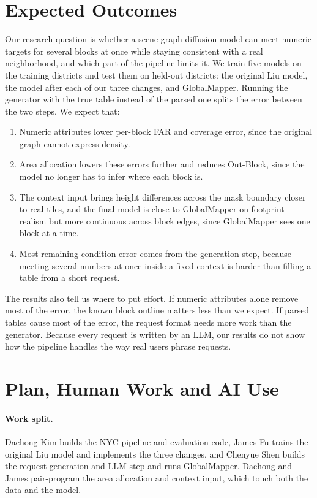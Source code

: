 \documentclass[twocolumn,11pt]{article}
\begin{document}
\section{Expected Outcomes}
Our research question is whether a scene-graph diffusion model can meet numeric targets for several blocks at once while staying consistent with a real neighborhood, and which part of the pipeline limits it. We train five models on the training districts and test them on held-out districts: the original Liu model, the model after each of our three changes, and GlobalMapper. Running the generator with the true table instead of the parsed one splits the error between the two steps. We expect that:

\begin{enumerate}
    \item Numeric attributes lower per-block FAR and coverage error, since the original graph cannot express density.
    \item Area allocation lowers these errors further and reduces Out-Block, since the model no longer has to infer where each block is.
    \item The context input brings height differences across the mask boundary closer to real tiles, and the final model is close to GlobalMapper on footprint realism but more continuous across block edges, since GlobalMapper sees one block at a time.
    \item Most remaining condition error comes from the generation step, because meeting several numbers at once inside a fixed context is harder than filling a table from a short request.
\end{enumerate}

The results also tell us where to put effort. If numeric attributes alone remove most of the error, the known block outline matters less than we expect. If parsed tables cause most of the error, the request format needs more work than the generator. Because every request is written by an LLM, our results do not show how the pipeline handles the way real users phrase requests.


\section{Plan, Human Work and AI Use}
\paragraph{Work split.} Daehong Kim builds the NYC pipeline and evaluation code, James Fu trains the original Liu model and implements the three changes, and Chenyue Shen builds the request generation and LLM step and runs GlobalMapper. Daehong and James pair-program the area allocation and context input, which touch both the data and the model.
\end{document}
